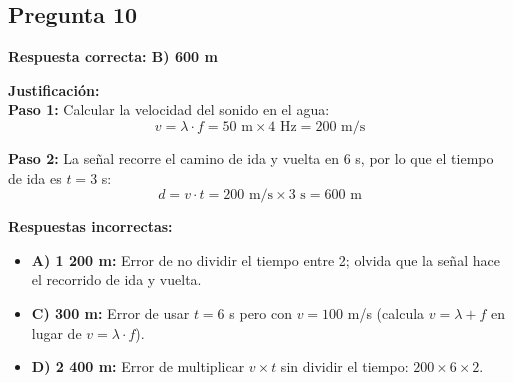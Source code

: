 \begin{respuestabox}
\subsection*{Pregunta 10}
\textcolor{verdecorrecto}{\textbf{Respuesta correcta: B) 600 m}}

\textbf{Justificación:}\\
\textbf{Paso 1:} Calcular la velocidad del sonido en el agua:
$$v = \lambda \cdot f = 50 \text{ m} \times 4 \text{ Hz} = 200 \text{ m/s}$$

\textbf{Paso 2:} La señal recorre el camino de ida y vuelta en 6 s, por lo que el tiempo de ida es $t = 3$ s:
$$d = v \cdot t = 200 \text{ m/s} \times 3 \text{ s} = 600 \text{ m}$$

\textbf{Respuestas incorrectas:}
\begin{itemize}
    \item \textbf{A) 1 200 m:} Error de no dividir el tiempo entre 2; olvida que la señal hace el recorrido de ida y vuelta.
    \item \textbf{C) 300 m:} Error de usar $t = 6$ s pero con $v = 100$ m/s (calcula $v = \lambda + f$ en lugar de $v = \lambda \cdot f$).
    \item \textbf{D) 2 400 m:} Error de multiplicar $v \times t$ sin dividir el tiempo: $200 \times 6 \times 2$.
\end{itemize}
\end{respuestabox}